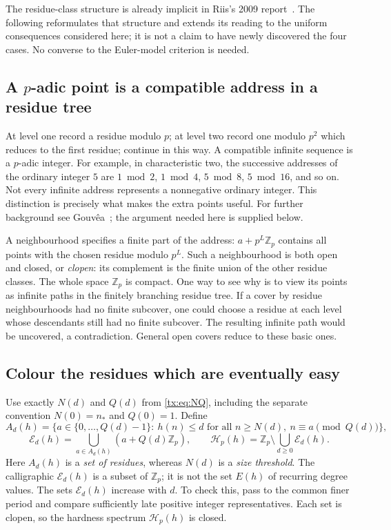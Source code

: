 \documentclass[11pt,a4paper,oneside,openany]{book}
\theoremstyle{definition}\newtheorem{definition}[theorem]{Definition}
\theoremstyle{remark}\newtheorem{remark}[theorem]{Remark}
\numberwithin{equation}{chapter}
\begin{document}
The residue-class structure is already implicit in Riis's 2009
report~\cite[Section~4, pp.~18--19]{RiisLong}. The following reformulates
that structure and extends its reading to the uniform consequences
considered here; it is not a claim to have newly discovered the four
cases. No converse to the Euler-model criterion is needed.

\subsection{A \texorpdfstring{$p$}{p}-adic point is a compatible address in a residue tree}
At level one record a residue modulo $p$; at level two record one modulo
$p^2$ which reduces to the first residue; continue in this way. A
compatible infinite sequence is a $p$-adic integer. For example, in
characteristic two, the successive addresses of the ordinary integer
$5$ are $1\bmod2$, $1\bmod4$, $5\bmod8$, $5\bmod16$, and so on.
Not every infinite address represents a nonnegative ordinary integer.
This distinction is precisely what makes the extra points useful.
For further background see Gouv\^ea~\cite{Gouvea}; the argument
needed here is supplied below.

A neighbourhood specifies a finite part of the address:
$a+p^L\mathbb Z_p$ contains all points with the chosen residue modulo
$p^L$. Such a neighbourhood is both open and closed, or \emph{clopen}:
its complement is the finite union of the other residue classes.
The whole space $\mathbb Z_p$ is compact. One way to see why is to
view its points as infinite paths in the finitely branching residue
tree. If a cover by residue neighbourhoods had no finite subcover,
one could choose a residue at each level whose descendants still had
no finite subcover. The resulting infinite path would be uncovered,
a contradiction. General open covers reduce to these basic ones.

\subsection{Colour the residues which are eventually easy}
Use exactly $N(d)$ and $Q(d)$ from \eqref{tx:eq:NQ}, including the
separate convention $N(0)=n_*$ and $Q(0)=1$. Define
\[
 A_d(h)=\{a\in\{0,\ldots,Q(d)-1\}:\ h(n)\le d
       \text{ for all }n\ge N(d),\ n\equiv a\pmod{Q(d)}\},
\]
\[
 \mathcal E_d(h)=\bigcup_{a\in A_d(h)}(a+Q(d)\mathbb Z_p),\qquad
 \mathcal H_p(h)=\mathbb Z_p\setminus\bigcup_{d\ge0}\mathcal E_d(h).
\]
Here $A_d(h)$ is a \emph{set of residues}, whereas $N(d)$ is a
\emph{size threshold}. The calligraphic $\mathcal E_d(h)$ is a subset
of $\mathbb Z_p$; it is not the set $E(h)$ of recurring degree values.
The sets $\mathcal E_d(h)$ increase with $d$. To check this, pass to
the common finer period and compare sufficiently late positive integer
representatives. Each set is clopen, so the hardness spectrum
$\mathcal H_p(h)$ is closed.
\end{document}
